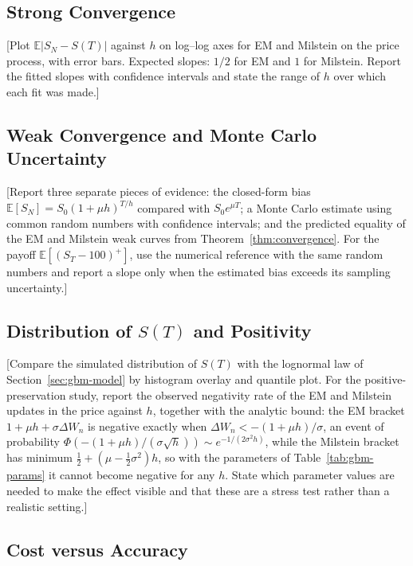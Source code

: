 \documentclass[11pt,a4paper]{article}
\theoremstyle{definition}
\theoremstyle{remark}
\begin{document}
\subsection{Strong Convergence}
\label{sec:strong}

[Plot $\mathbb{E}|S_N - S(T)|$ against $h$ on log--log axes for EM and Milstein
on the price process, with error bars. Expected slopes: $1/2$ for EM and $1$ for
Milstein. Report the fitted slopes with confidence intervals and state the range
of $h$ over which each fit was made.]

\subsection{Weak Convergence and Monte Carlo Uncertainty}
\label{sec:weak}

[Report three separate pieces of evidence: the closed-form bias
$\mathbb{E}[S_N] = S_0 (1 + \mu h)^{T/h}$ compared with $S_0 e^{\mu T}$; a Monte
Carlo estimate using common random numbers with confidence intervals; and the
predicted equality of the EM and Milstein weak curves from
Theorem~\ref{thm:convergence}. For the payoff $\mathbb{E}[(S_T - 100)^+]$, use
the numerical reference with the same random numbers and report a slope only
when the estimated bias exceeds its sampling uncertainty.]

\subsection{Distribution of $S(T)$ and Positivity}
\label{sec:distribution}

[Compare the simulated distribution of $S(T)$ with the lognormal law of
Section~\ref{sec:gbm-model} by histogram overlay and quantile plot. For the
positive-preservation study, report the observed negativity rate of the EM and
Milstein updates in the price against $h$, together with the analytic bound:
the EM bracket $1 + \mu h + \sigma \Delta W_n$ is negative exactly when
$\Delta W_n < -(1 + \mu h)/\sigma$, an event of probability
$\Phi\!\left( -(1 + \mu h)/(\sigma\sqrt{h}) \right) \sim e^{-1/(2\sigma^2 h)}$,
while the Milstein bracket has minimum $\tfrac12 + (\mu - \tfrac12\sigma^2)h$, so
with the parameters of Table~\ref{tab:gbm-params} it cannot become negative for
any $h$. State which parameter values are needed to make the effect visible and
that these are a stress test rather than a realistic setting.]

\subsection{Cost versus Accuracy}
\label{sec:cost}
\end{document}

